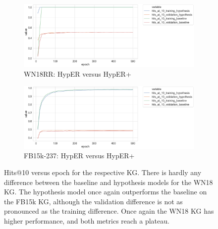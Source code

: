 
\begin{figure}[H]
	\begin{subfigure}[b]{.5\linewidth}
   		\centering
    		\includegraphics[width=1.0\linewidth, height=0.6\linewidth]{WN18RR_hits_at_10_Results}
		\captionsetup{justification=centering}
		\caption{WN18RR: HypER versus HypER+}
	\end{subfigure}
	\begin{subfigure}[b]{.5\linewidth}
   		\centering
		\includegraphics[width=1.0\linewidth, height=0.6\linewidth]{FB15k-237_hits_at_10_Results}
		\captionsetup{justification=centering}
		\caption{FB15k-237: HypER versus HypER+}
	\end{subfigure}
	\captionsetup{justification=centering}
	\caption{Hits@10 versus epoch for the respective KG. There is hardly any difference between the baseline and hypothesis models for the WN18 KG. The hypothesis model once again outperforms the baseline on the FB15k KG, although the validation difference is not as pronounced as the training difference. Once again the WN18 KG has higher performance, and both metrics reach a plateau.}
\end{figure}

